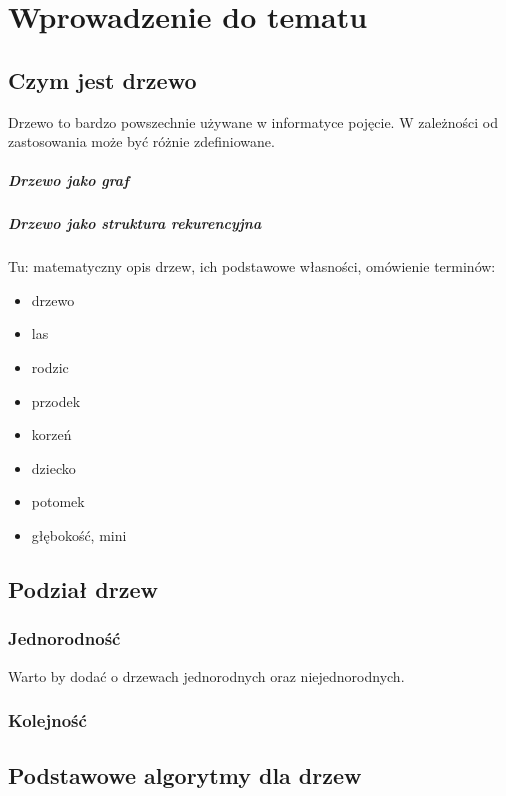 \chapter{Wprowadzenie do tematu}

\section{Czym jest drzewo}

Drzewo to bardzo powszechnie używane w informatyce pojęcie. W zależności od zastosowania może być różnie zdefiniowane.

\paragraph{Drzewo jako graf}

\paragraph{Drzewo jako struktura rekurencyjna}


Tu: matematyczny opis drzew, ich podstawowe własności, omówienie terminów:
\begin{itemize}
    \item drzewo
    \item las
    \item rodzic
    \item przodek
    \item korzeń
    \item dziecko
    \item potomek
    \item głębokość, mini
\end{itemize}

\section{Podział drzew}
\subsection{Jednorodność}
Warto by dodać o drzewach jednorodnych oraz niejednorodnych.

\subsection{Kolejność}


\section{Podstawowe algorytmy dla drzew}
